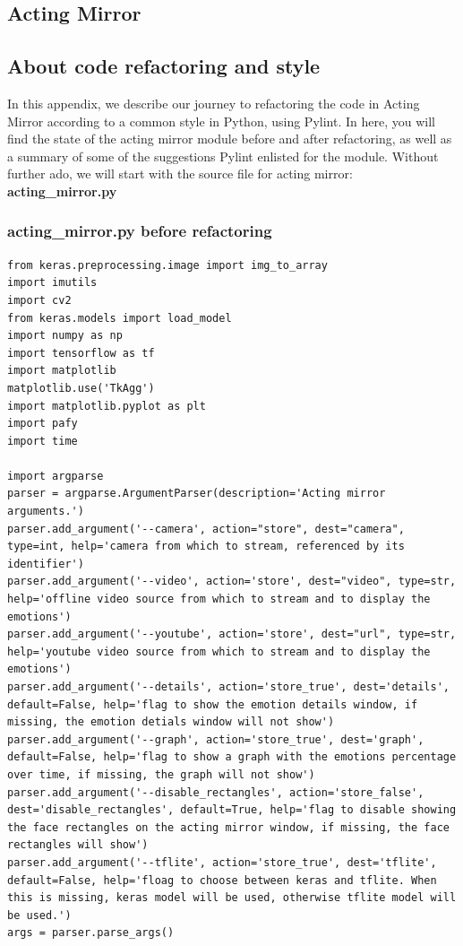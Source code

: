 \documentclass[runningheads,a4paper,11pt]{report}
\begin{document}
\begin{appendices}
\chapter{Acting Mirror}
\section{About code refactoring and style}

In this appendix, we describe our journey to refactoring the code in Acting Mirror according to a common style in Python, using Pylint. In here, you will find the state of the acting mirror module before and after refactoring, as well as a summary of some of the suggestions Pylint enlisted for the module. Without further ado, we will start with the source file for acting mirror: \textbf{acting\_mirror.py} \\
\subsection{acting\_mirror.py before refactoring}
\begin{lstlisting}
from keras.preprocessing.image import img_to_array
import imutils
import cv2
from keras.models import load_model
import numpy as np
import tensorflow as tf
import matplotlib
matplotlib.use('TkAgg')
import matplotlib.pyplot as plt
import pafy
import time

import argparse
parser = argparse.ArgumentParser(description='Acting mirror arguments.')
parser.add_argument('--camera', action="store", dest="camera", type=int, help='camera from which to stream, referenced by its identifier')
parser.add_argument('--video', action='store', dest="video", type=str, help='offline video source from which to stream and to display the emotions')
parser.add_argument('--youtube', action='store', dest="url", type=str, help='youtube video source from which to stream and to display the emotions')
parser.add_argument('--details', action='store_true', dest='details', default=False, help='flag to show the emotion details window, if missing, the emotion detials window will not show')
parser.add_argument('--graph', action='store_true', dest='graph', default=False, help='flag to show a graph with the emotions percentage over time, if missing, the graph will not show')
parser.add_argument('--disable_rectangles', action='store_false', dest='disable_rectangles', default=True, help='flag to disable showing the face rectangles on the acting mirror window, if missing, the face rectangles will show')
parser.add_argument('--tflite', action='store_true', dest='tflite', default=False, help='floag to choose between keras and tflite. When this is missing, keras model will be used, otherwise tflite model will be used.')
args = parser.parse_args()


\end{lstlisting}
\end{appendices}
\end{document}
